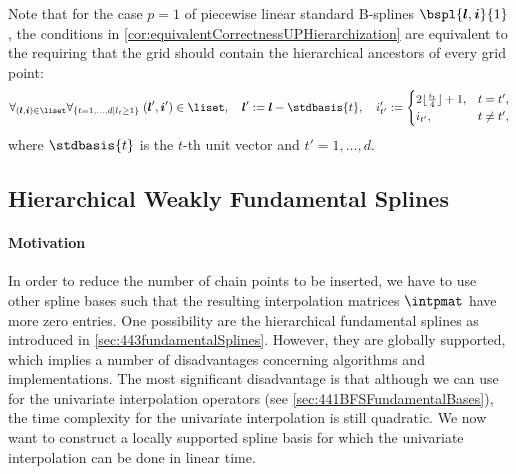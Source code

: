 Note that for the case $p = 1$ of piecewise linear
standard B-splines $\bspl{\*l,\*i}{1}$, the conditions in
\cref{cor:equivalentCorrectnessUPHierarchization}
are equivalent to the requiring that the grid should contain
the hierarchical ancestors of every grid point:
\begin{equation}
  \fafa{(\*l,\*i) \in \liset}{\{t = 1, \dotsc, d \mid l_t \ge 1\}}{
    (\*l',\*i') \in \liset
  },\quad
  \*l' := \*l - \stdbasis{t},\quad
  i_{t'}' :=
  \begin{cases}
    2 \floor{\tfrac{i_t}{4}} + 1,&t = t',\\
    i_{t'},&t \not= t',
  \end{cases}
\end{equation}
where $\stdbasis{t}$ is the $t$-th unit vector and $t' = 1, \dotsc, d$.



\subsection{Hierarchical Weakly Fundamental Splines}
\label{sec:454wfs}

\paragraph{Motivation}

In order to reduce the number of chain points to be inserted,
we have to use other spline bases such that
the resulting interpolation matrices $\intpmat$ have more zero entries.
One possibility are the hierarchical fundamental splines
as introduced in \cref{sec:443fundamentalSplines}.
However, they are globally supported, which implies a number
of disadvantages concerning algorithms and implementations.
The most significant disadvantage is that although
we can use \bfs for the univariate interpolation operators
(see \cref{sec:441BFSFundamentalBases}),
the time complexity for the univariate interpolation is still quadratic.
We now want to construct a locally supported spline basis for which
the univariate interpolation can be done in linear time.

